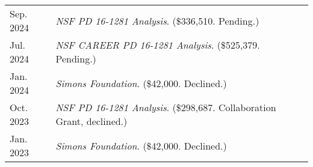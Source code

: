 
    \medskip


    \medskip
    
    \begin{center}
    {
    \renewcommand{\arraystretch}{1.5}
    \begin{longtable}{p{}  p{}}
     Sep.  2024 & \textit{NSF PD 16-1281 Analysis}. (\$336,510. Pending.) \\ 
 Jul.  2024 & \textit{NSF CAREER PD 16-1281 Analysis}. (\$525,379. Pending.) \\ 
 Jan.  2024 & \textit{Simons Foundation}. (\$42,000. Declined.) \\ 
 Oct.  2023 & \textit{NSF PD 16-1281 Analysis}. (\$298,687. Collaboration Grant, declined.) \\ 
 Jan.  2023 & \textit{Simons Foundation}. (\$42,000. Declined.) 
    \end{longtable}
    } 
    \end{center}

    \vspace{-1em}
    